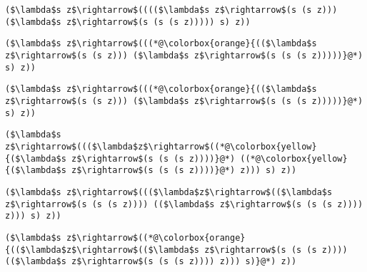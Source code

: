 \documentclass{beamer}
\begin{document}
\begin{frame}[fragile]{\CurrentSection}
\lstset{basicstyle=\ttfamily\small}\lstset{numbers=none}\lstset{language=ML}\begin{lstlisting}
($\lambda$s z$\rightarrow$(((($\lambda$s z$\rightarrow$(s (s z))) ($\lambda$s z$\rightarrow$(s (s (s z))))) s) z))
\end{lstlisting}
\pause\lstset{language=ML}\begin{lstlisting}
($\lambda$s z$\rightarrow$(((*@\colorbox{orange}{(($\lambda$s z$\rightarrow$(s (s z))) ($\lambda$s z$\rightarrow$(s (s (s z)))))}@*) s) z))
\end{lstlisting}

\end{frame}

\begin{frame}[fragile]{\CurrentSection}
\lstset{basicstyle=\ttfamily\small}\lstset{numbers=none}\lstset{language=ML}\begin{lstlisting}
($\lambda$s z$\rightarrow$(((*@\colorbox{orange}{(($\lambda$s z$\rightarrow$(s (s z))) ($\lambda$s z$\rightarrow$(s (s (s z)))))}@*) s) z))
\end{lstlisting}
\pause\lstset{language=ML}\begin{lstlisting}
($\lambda$s z$\rightarrow$((($\lambda$z$\rightarrow$((*@\colorbox{yellow}{($\lambda$s z$\rightarrow$(s (s (s z))))}@*) ((*@\colorbox{yellow}{($\lambda$s z$\rightarrow$(s (s (s z))))}@*) z))) s) z))
\end{lstlisting}

\end{frame}

\begin{frame}[fragile]{\CurrentSection}
\lstset{basicstyle=\ttfamily\small}\lstset{numbers=none}\lstset{language=ML}\begin{lstlisting}
($\lambda$s z$\rightarrow$((($\lambda$z$\rightarrow$(($\lambda$s z$\rightarrow$(s (s (s z)))) (($\lambda$s z$\rightarrow$(s (s (s z)))) z))) s) z))
\end{lstlisting}
\pause\lstset{language=ML}\begin{lstlisting}
($\lambda$s z$\rightarrow$((*@\colorbox{orange}{(($\lambda$z$\rightarrow$(($\lambda$s z$\rightarrow$(s (s (s z)))) (($\lambda$s z$\rightarrow$(s (s (s z)))) z))) s)}@*) z))
\end{lstlisting}

\end{frame}
\end{document}
